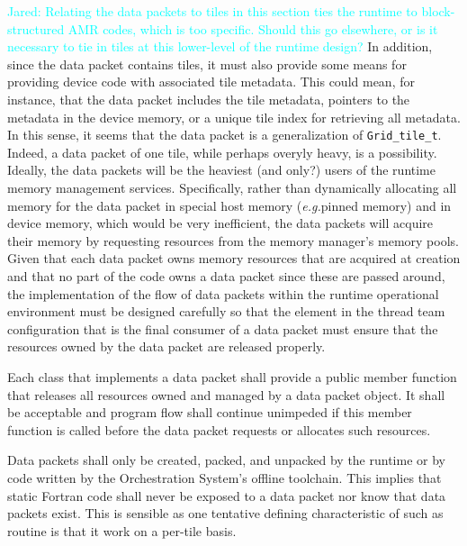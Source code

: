 \documentclass{article}
\newcommand{\code}[1]{{\tt#1}}
\newcommand{\eg}{\textit{e.g.}}   %
\newcommand{\Jared}[1]          {\textcolor{cyan}{Jared: #1}}
\begin{document}
\Jared{Relating the data packets to tiles in this section ties the runtime to
block-structured AMR codes, which is too specific.  Should this go elsewhere, or
is it necessary to tie in tiles at this lower-level of the runtime design?}  In
addition, since the data packet contains tiles, it must also provide some means
for providing device code with associated tile metadata.  This could mean, for
instance, that the data packet includes the tile metadata, pointers to the
metadata in the device memory, or a unique tile index for retrieving all
metadata.  In this sense, it seems that the data packet is a generalization of
\code{Grid\_tile\_t}.  Indeed, a data packet of one tile, while perhaps overyly
heavy, is a possibility.\\

Ideally, the data packets will be the heaviest (and only?) users of the runtime
memory management services.  Specifically, rather than dynamically allocating
all memory for the data packet in special host memory (\eg pinned memory) and in
device memory, which would be very inefficient, the data packets will acquire
their memory by requesting resources from the memory manager's memory pools.\\

Given that each data packet owns memory resources that are acquired at creation
and that no part of the code owns a data packet since these are passed around,
the implementation of the flow of data packets within the runtime operational
environment must be designed carefully so that the element in the thread team
configuration that is the final consumer of a data packet must ensure that the
resources owned by the data packet are released properly.

\begin{spec}
Each class that implements a data packet shall provide a public member function
that releases all resources owned and managed by a data packet object.  It shall
be acceptable and program flow shall continue unimpeded if this member function
is called before the data packet requests or allocates such resources.
\end{spec}

\begin{spec}
Data packets shall only be created, packed, and unpacked by the runtime or by
code written by the Orchestration System's offline toolchain.  This implies that
static Fortran code shall never be exposed to a data packet nor know that data
packets exist.  This is sensible as one tentative defining characteristic of
such as routine is that it work on a per-tile basis.
\end{spec}
\end{document}
